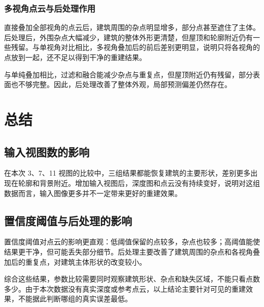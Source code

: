 \subsubsection{多视角点云与后处理作用}

直接叠加全部视角的点云后，建筑周围的杂点明显增多，部分点甚至遮住了主体。后处理后，外围杂点大幅减少，建筑的整体外形更清楚，但屋顶和轮廓附近仍有一些残留。与单视角对比相比，多视角叠加后的前后差别更明显，说明只将各视角的点放到一起，还不足以得到干净的重建结果。

与单纯叠加相比，过滤和融合能减少杂点与重复点，但屋顶附近仍有残留，部分表面也不够完整。因此，后处理改善了整体外观，局部预测偏差仍然存在。

\section{总结}
\subsection{输入视图数的影响}

在本次 3、7、11 视图的比较中，三组结果都能恢复建筑的主要形状，差别更多出现在轮廓和背景附近。增加输入视图后，深度图和点云没有持续变好，说明对这组数据而言，输入图像更多并不一定带来更好的重建效果。

\subsection{置信度阈值与后处理的影响}

置信度阈值对点云的影响更直观：低阈值保留的点较多，杂点也较多；高阈值能使结果更干净，但可能丢失部分细节。后处理主要改善了建筑周围的杂点和各视角叠加后的重复点，对建筑主体形状的改变较小。

综合这些结果，参数比较需要同时观察建筑形状、杂点和缺失区域，不能只看点数多少。由于本次数据没有真实深度或参考点云，以上结论主要针对可见的重建效果，不能据此判断哪组的真实误差最低。
